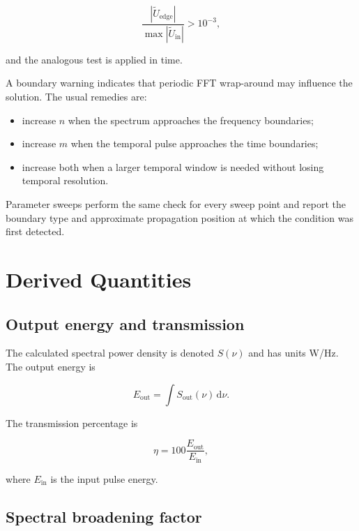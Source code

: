 \documentclass[11pt,a4paper]{article}
\newcommand{\dd}{\mathrm{d}}
\begin{document}
\begin{equation}
\frac{|\widetilde U_{\mathrm{edge}}|}
     {\max|\widetilde U_{\mathrm{in}}|}>10^{-3},
\end{equation}

and the analogous test is applied in time.

A boundary warning indicates that periodic FFT wrap-around may influence the
solution. The usual remedies are:

\begin{itemize}
    \item increase $n$ when the spectrum approaches the frequency boundaries;
    \item increase $m$ when the temporal pulse approaches the time boundaries;
    \item increase both when a larger temporal window is needed without losing
    temporal resolution.
\end{itemize}

Parameter sweeps perform the same check for every sweep point and report the
boundary type and approximate propagation position at which the condition was
first detected.

\section{Derived Quantities}

\subsection{Output energy and transmission}

The calculated spectral power density is denoted $S(\nu)$ and has units W/Hz.
The output energy is

\begin{equation}
\boxed{
E_{\mathrm{out}}
=\int S_{\mathrm{out}}(\nu)\,\dd\nu.
}
\end{equation}

The transmission percentage is

\begin{equation}
\boxed{
\eta
=100\frac{E_{\mathrm{out}}}{E_{\mathrm{in}}},
}
\end{equation}

where $E_{\mathrm{in}}$ is the input pulse energy.

\subsection{Spectral broadening factor}
\end{document}
